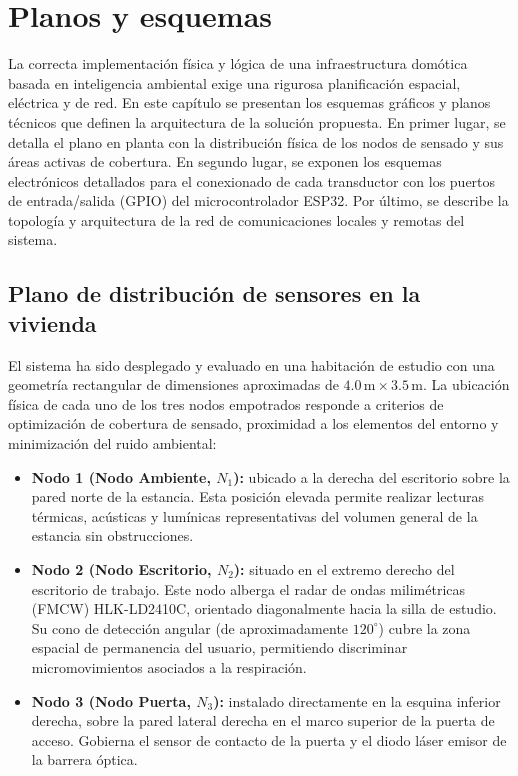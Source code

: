 \newpage
\section{Planos y esquemas}
\label{cap:planos_esquemas}

La correcta implementación física y lógica de una infraestructura domótica basada en inteligencia ambiental exige una rigurosa planificación espacial, eléctrica y de red. En este capítulo se presentan los esquemas gráficos y planos técnicos que definen la arquitectura de la solución propuesta. En primer lugar, se detalla el plano en planta con la distribución física de los nodos de sensado y sus áreas activas de cobertura. En segundo lugar, se exponen los esquemas electrónicos detallados para el conexionado de cada transductor con los puertos de entrada/salida (GPIO) del microcontrolador ESP32. Por último, se describe la topología y arquitectura de la red de comunicaciones locales y remotas del sistema.

\subsection{Plano de distribución de sensores en la vivienda}
\label{sec:plano_distribucion}

El sistema ha sido desplegado y evaluado en una habitación de estudio con una geometría rectangular de dimensiones aproximadas de $4.0\,\text{m} \times 3.5\,\text{m}$. La ubicación física de cada uno de los tres nodos empotrados responde a criterios de optimización de cobertura de sensado, proximidad a los elementos del entorno y minimización del ruido ambiental:

\begin{itemize}
    \item \textbf{Nodo 1 (Nodo Ambiente, $N_1$):} ubicado a la derecha del escritorio sobre la pared norte de la estancia. Esta posición elevada permite realizar lecturas térmicas, acústicas y lumínicas representativas del volumen general de la estancia sin obstrucciones.
    \item \textbf{Nodo 2 (Nodo Escritorio, $N_2$):} situado en el extremo derecho del escritorio de trabajo. Este nodo alberga el radar de ondas milimétricas (FMCW) HLK-LD2410C, orientado diagonalmente hacia la silla de estudio. Su cono de detección angular (de aproximadamente $120^\circ$) cubre la zona espacial de permanencia del usuario, permitiendo discriminar micromovimientos asociados a la respiración.
    \item \textbf{Nodo 3 (Nodo Puerta, $N_3$):} instalado directamente en la esquina inferior derecha, sobre la pared lateral derecha en el marco superior de la puerta de acceso. Gobierna el sensor de contacto de la puerta y el diodo láser emisor de la barrera óptica.
\end{itemize}

